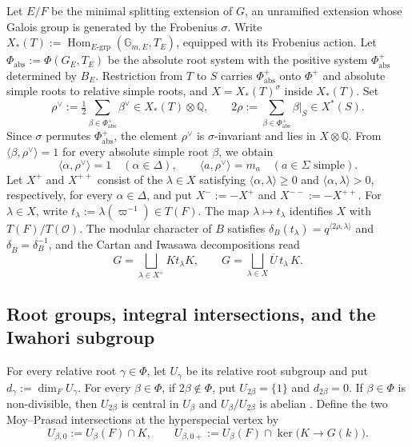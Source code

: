 \documentclass[12pt]{article}
\numberwithin{equation}{section}
\theoremstyle{definition}
\theoremstyle{remark}
\theoremstyle{plain}
\begin{document}
Let $E/F$ be the minimal splitting extension of $G$, an unramified extension whose Galois group is generated by the Frobenius $\sigma$. Write $X_*(T):=\operatorname{Hom}_{E\text{-grp}}(\mathbb G_{m,E},T_E)$, equipped with its Frobenius action. Let $\Phi_{\mathrm{abs}} := \Phi(G_E, T_E)$ be the absolute root system with the positive system $\Phi^+_{\mathrm{abs}}$ determined by $B_E$. Restriction from $T$ to $S$ carries $\Phi^+_{\mathrm{abs}}$ onto $\Phi^+$ and absolute simple roots to relative simple roots, and $X = X_*(T)^\sigma$ inside $X_*(T)$. Set
$$\rho^\vee := \tfrac{1}{2}\sum_{\beta\in\Phi^+_{\mathrm{abs}}}\beta^\vee \in X_*(T)\otimes\mathbb{Q}, \qquad 2\rho := \sum_{\beta\in\Phi^+_{\mathrm{abs}}}\beta|_S \in X^*(S).$$
Since $\sigma$ permutes $\Phi^+_{\mathrm{abs}}$, the element $\rho^\vee$ is $\sigma$-invariant and lies in $X\otimes\mathbb{Q}$. From $\langle\beta,\rho^\vee\rangle = 1$ for every absolute simple root $\beta$, we obtain
\begin{equation}\label{eq:rho_pairings}
\langle \alpha, \rho^\vee\rangle = 1 \quad (\alpha \in \Delta), \qquad \langle a, \rho^\vee\rangle = m_a \quad (a \in \Sigma \text{ simple}).
\end{equation}
Let $X^+$ and $X^{++}$ consist of the $\lambda\in X$ satisfying $\langle\alpha,\lambda\rangle\geq 0$ and $\langle\alpha,\lambda\rangle>0$, respectively, for every $\alpha\in\Delta$, and put $X^-:=-X^+$ and $X^{--}:=-X^{++}$. For $\lambda \in X$, write $t_\lambda := \lambda(\varpi^{-1}) \in T(F)$. The map $\lambda \mapsto t_\lambda$ identifies $X$ with $T(F)/T(\mathcal{O})$. The modular character of $B$ satisfies $\delta_B(t_\lambda) = q^{\langle 2\rho,\lambda\rangle}$ and $\delta_{\overline{B}} = \delta_B^{-1}$, and the Cartan and Iwasawa decompositions read
$$G = \bigsqcup_{\lambda \in X^+} K t_\lambda K, \qquad G = \bigsqcup_{\lambda \in X} \overline{U}\, t_\lambda\, K.$$

\subsection{Root groups, integral intersections, and the Iwahori subgroup}
For every relative root $\gamma\in\Phi$, let $U_\gamma$ be its relative root subgroup and put $d_\gamma:=\dim_FU_\gamma$. For every $\beta\in\Phi$, if $2\beta\notin\Phi$, put $U_{2\beta}=\{1\}$ and $d_{2\beta}=0$. If $\beta\in\Phi$ is non-divisible, then $U_{2\beta}$ is central in $U_\beta$ and $U_\beta/U_{2\beta}$ is abelian \cite[Lemma 3.3.8]{CGP}. Define the two Moy--Prasad intersections at the hyperspecial vertex by
$$U_{\beta,0}:=U_\beta(F)\cap K,\qquad U_{\beta,0+}:=U_\beta(F)\cap\ker\bigl(K\to G(k)\bigr).$$
\end{document}
